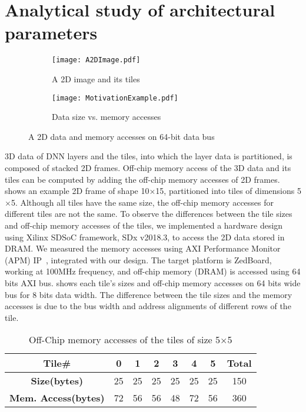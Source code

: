 \section{Analytical study of architectural parameters}\label{sec:OffChipAccessModel}
\begin{figure}[!htb]
	\centering
	\captionsetup{font=sf}
	\begin{subfigure}[t]{0.45\textwidth}
		\centering
		\texttt{[image: A2DImage.pdf]}
		\caption{A 2D image and its tiles}
		\label{fig:A2DImage}
	\end{subfigure}
	\hfil
	\begin{subfigure}[t]{0.4\textwidth}
		\centering
		\texttt{[image: MotivationExample.pdf]}
		\caption{Data size vs. memory accesses}
		\label{fig:bitPerPixelEffect}
	\end{subfigure}		
	\caption{A 2D data and memory accesses on 64-bit data bus}
	\label{fig:2DPartitionedData}
	\vspace{-1.0em}	
\end{figure}

3D data of DNN layers and the tiles, into which the layer data is partitioned, is composed of stacked 2D frames. Off-chip memory access of the 3D data and its tiles can be computed by adding the off-chip memory accesses of 2D frames.  shows an example 2D frame of shape 10$\times$15, partitioned into tiles of dimensions 5$\times$5. Although all tiles have the same size, the off-chip memory accesses for different tiles are not the same. To observe the differences between the tile sizes and off-chip memory accesses of the tiles, we implemented a hardware design using Xilinx SDSoC framework, SDx v2018.3, to access the 2D data stored in DRAM. We measured the memory accesses using AXI Performance Monitor (APM) IP~\cite{APM}, integrated with our design. The target platform is ZedBoard, working at 100MHz frequency, and off-chip memory (DRAM) is accessed using 64 bits AXI bus.  shows each tile's sizes and off-chip memory accesses on 64 bits wide bus for 8 bits data width. The difference between the tile sizes and the memory accesses is due to the bus width and address alignments of different rows of the tile. 
\begin{table}[htb]
	\centering
	\caption{Off-Chip memory accesses of the tiles of size 5$\times$5 }
	\begin{tabular}{|c|c|c|c|c|c|c|c|}
		\hline
		\textbf{Tile\#}& 0  & 1  & 2  & 3  & 4  & 5  & \textbf{Total} \\ \hline
		\textbf{Size(bytes)}& 25 & 25 & 25 & 25 & 25 & 25 & 150   \\ \hline
		\textbf{Mem. Access(bytes)} & 72 & 56 & 56 & 48 & 72 & 56 & 360  \\
		\hline
	\end{tabular}
	\label{tab:TileOffChipAccesses}
\end{table}

